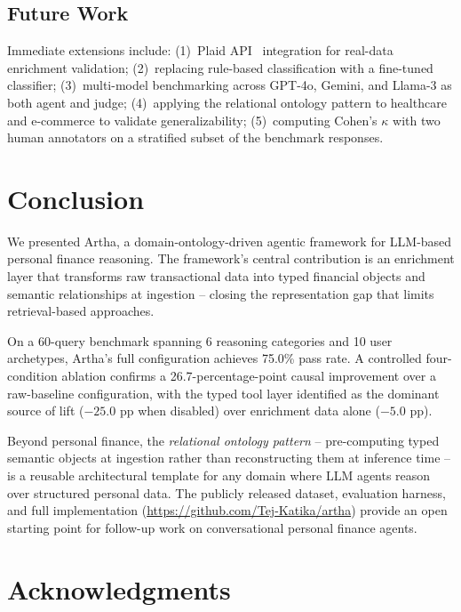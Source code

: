 \documentclass[conference]{IEEEtran}
\begin{document}
\subsection*{Future Work}

Immediate extensions include: (1)~Plaid API~\cite{plaid}
integration for real-data enrichment validation;
(2)~replacing rule-based classification with a fine-tuned
classifier; (3)~multi-model benchmarking across GPT-4o, Gemini,
and Llama-3 as both agent and judge; (4)~applying the relational
ontology pattern to healthcare and e-commerce to validate
generalizability; (5)~computing Cohen's $\kappa$ with two human
annotators on a stratified subset of the benchmark responses.

\section{Conclusion}

We presented Artha, a domain-ontology-driven agentic framework for
LLM-based personal finance reasoning. The framework's central
contribution is an enrichment layer that transforms raw
transactional data into typed financial objects and semantic
relationships at ingestion -- closing the representation gap that
limits retrieval-based approaches.

On a 60-query benchmark spanning 6 reasoning categories and 10
user archetypes, Artha's full configuration achieves 75.0\% pass
rate. A controlled four-condition ablation confirms a
26.7-percentage-point causal improvement over a raw-baseline
configuration, with the typed tool layer identified as the
dominant source of lift ($-25.0$ pp when disabled) over enrichment
data alone ($-5.0$ pp).

Beyond personal finance, the \emph{relational ontology pattern} --
pre-computing typed semantic objects at ingestion rather than
reconstructing them at inference time -- is a reusable
architectural template for any domain where LLM agents reason over
structured personal data. The publicly released dataset,
evaluation harness, and full implementation
(\url{https://github.com/Tej-Katika/artha}) provide an open
starting point for follow-up work on conversational personal
finance agents.

\section*{Acknowledgments}
\end{document}
